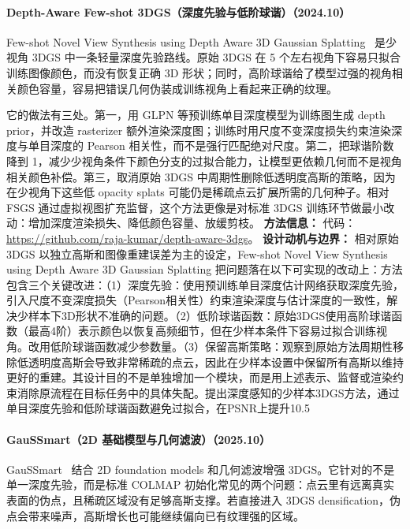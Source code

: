 \paragraph{Depth-Aware Few-shot 3DGS（深度先验与低阶球谐）（2024.10）}
Few-shot Novel View Synthesis using Depth Aware 3D Gaussian Splatting~\cite{2410_11080} 是少视角 3DGS 中一条轻量深度先验路线。原始 3DGS 在 5 个左右视角下容易只拟合训练图像颜色，而没有恢复正确 3D 形状；同时，高阶球谐给了模型过强的视角相关颜色容量，容易把错误几何伪装成训练视角上看起来正确的纹理。

它的做法有三处。第一，用 GLPN 等预训练单目深度模型为训练图生成 depth prior，并改造 rasterizer 额外渲染深度图；训练时用尺度不变深度损失约束渲染深度与单目深度的 Pearson 相关性，而不是强行匹配绝对尺度。第二，把球谐阶数降到 1，减少少视角条件下颜色分支的过拟合能力，让模型更依赖几何而不是视角相关颜色补偿。第三，取消原始 3DGS 中周期性删除低透明度高斯的策略，因为在少视角下这些低 opacity splats 可能仍是稀疏点云扩展所需的几何种子。相对 FSGS 通过虚拟视图扩充监督，这个方法更像是对标准 3DGS 训练环节做最小改动：增加深度渲染损失、降低颜色容量、放缓剪枝。
\textbf{方法信息：} 代码：\url{https://github.com/raja-kumar/depth-aware-3dgs}。
\textbf{设计动机与边界：} 相对原始 3DGS 以独立高斯和图像重建误差为主的设定，Few-shot Novel View Synthesis using Depth Aware 3D Gaussian Splatting 把问题落在以下可实现的改动上：方法包含三个关键改进：（1）深度先验：使用预训练单目深度估计网络获取深度先验，引入尺度不变深度损失（Pearson相关性）约束渲染深度与估计深度的一致性，解决少样本下3D形状不准确的问题。（2）低阶球谐函数：原始3DGS使用高阶球谐函数（最高4阶）表示颜色以恢复高频细节，但在少样本条件下容易过拟合训练视角。改用低阶球谐函数减少参数量。（3）保留高斯策略：观察到原始方法周期性移除低透明度高斯会导致非常稀疏的点云，因此在少样本设置中保留所有高斯以维持更好的重建。其设计目的不是单独增加一个模块，而是用上述表示、监督或渲染约束消除原流程在目标任务中的具体失配。提出深度感知的少样本3DGS方法，通过单目深度先验和低阶球谐函数避免过拟合，在PSNR上提升10.5%
\paragraph{GauSSmart（2D 基础模型与几何滤波）（2025.10）}
GauSSmart~\cite{2510_14270} 结合 2D foundation models 和几何滤波增强 3DGS。它针对的不是单一深度先验，而是标准 COLMAP 初始化常见的两个问题：点云里有远离真实表面的伪点，且稀疏区域没有足够高斯支撑。若直接进入 3DGS densification，伪点会带来噪声，高斯增长也可能继续偏向已有纹理强的区域。


